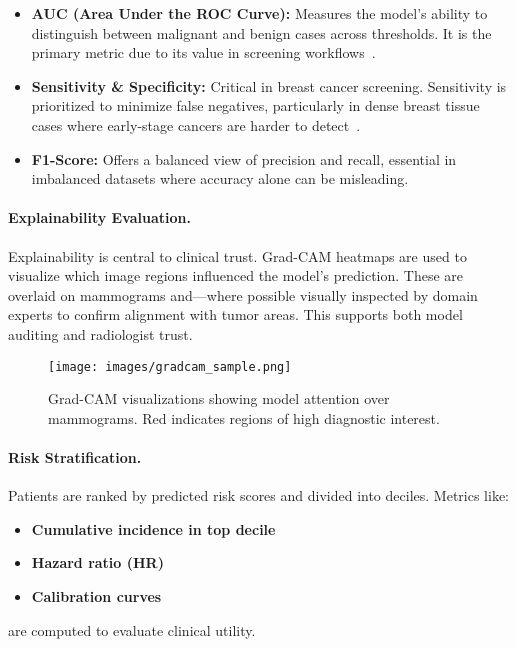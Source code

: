 \documentclass[12pt]{article}
\begin{document}
\begin{itemize}
    \item \textbf{AUC (Area Under the ROC Curve):} Measures the model’s ability to distinguish between malignant and benign cases across thresholds. It is the primary metric due to its value in screening workflows~\cite{1}.
    
    \item \textbf{Sensitivity \& Specificity:} Critical in breast cancer screening. Sensitivity is prioritized to minimize false negatives, particularly in dense breast tissue cases where early-stage cancers are harder to detect~\cite{6}.
    
    \item \textbf{F1-Score:} Offers a balanced view of precision and recall, essential in imbalanced datasets where accuracy alone can be misleading.
\end{itemize}

\paragraph{Explainability Evaluation.}
Explainability is central to clinical trust. Grad-CAM heatmaps are used to visualize which image regions influenced the model’s prediction. These are overlaid on mammograms and—where possible visually inspected by domain experts to confirm alignment with tumor areas. This supports both model auditing and radiologist trust.

\begin{figure}[H]
    \centering
    \texttt{[image: images/gradcam\_sample.png]}
    \caption{Grad-CAM visualizations showing model attention over mammograms. Red indicates regions of high diagnostic interest.}
\end{figure}

\paragraph{Risk Stratification.}
Patients are ranked by predicted risk scores and divided into deciles. Metrics like:
\begin{itemize}
    \item \textbf{Cumulative incidence in top decile}
    \item \textbf{Hazard ratio (HR)}
    \item \textbf{Calibration curves}
\end{itemize}
are computed to evaluate clinical utility.
\end{document}
